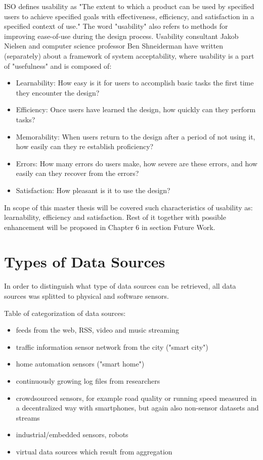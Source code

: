	ISO defines usability as "The extent to which a product can be used by specified users to achieve specified goals with effectiveness, efficiency, and satisfaction in a specified context of use." The word "usability" also refers to methods for improving ease-of-use during the design process. Usability consultant Jakob Nielsen and computer science professor Ben Shneiderman have written (separately) about a framework of system acceptability, where usability is a part of "usefulness" and is composed of\cite{jakob}:
	\begin{itemize}
	\item Learnability: How easy is it for users to accomplish basic tasks the first time they encounter the design?
	\item Efficiency: Once users have learned the design, how quickly can they perform tasks?
	\item Memorability: When users return to the design after a period of not using it, how easily can they re establish proficiency?
	\item Errors: How many errors do users make, how severe are these errors, and how easily can they recover from the errors?
	\item Satisfaction: How pleasant is it to use the design?
	\end{itemize}

	In scope of this master thesis will be covered such characteristics of usability as: learnability, efficiency and satisfaction. Rest of it together with possible enhancement will be proposed in Chapter 6 in section Future Work.

\section {Types of Data Sources}
    In order to distinguish what type of data sources can be retrieved, all data sources was splitted to physical and software sensors.

    Table of categorization of data sources:
    \begin{itemize}
    \item feeds from the web, RSS, video and music streaming
    \item traffic information sensor network from the city ("smart city")
    \item home automation sensors ("smart home")
    \item continuously growing log files from researchers
    \item crowdsourced sensors, for example road quality or running speed measured in a decentralized way with smartphones, but again also non-sensor datasets and streams
    \item industrial/embedded sensors, robots
    \item virtual data sources which result from aggregation
    \end{itemize}

